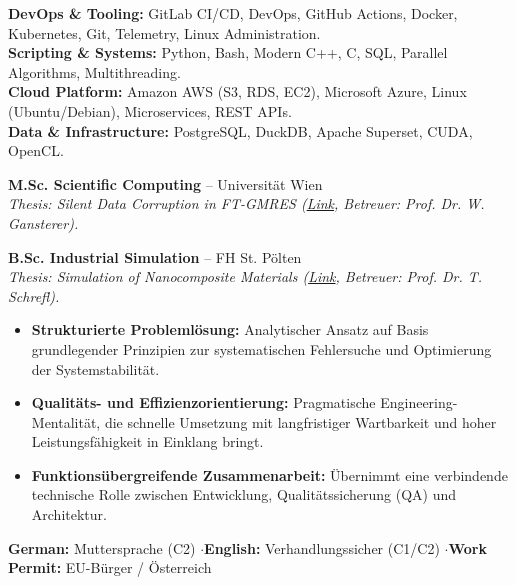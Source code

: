 \documentclass[10pt,a4paper]{article}
\begin{document}

\textbf{DevOps \& Tooling:} GitLab CI/CD, DevOps, GitHub Actions, Docker, Kubernetes, Git, Telemetry, Linux Administration.\\[0.05em]
\textbf{Scripting \& Systems:} Python, Bash, Modern C++, C, SQL, Parallel Algorithms, Multithreading.\\[0.05em]
\textbf{Cloud Platform:} Amazon AWS (S3, RDS, EC2), Microsoft Azure, Linux (Ubuntu/Debian), Microservices, REST APIs.\\[0.05em]
\textbf{Data \& Infrastructure:} PostgreSQL, DuckDB, Apache Superset, CUDA, OpenCL.


\textbf{M.Sc. Scientific Computing} -- Universität Wien \\
\textit{Thesis: Silent Data Corruption in FT-GMRES (\href{https://utheses.univie.ac.at/detail/40917/}{Link}, Betreuer: Prof. Dr. W. Gansterer).}

\vspace{0.1cm}
\textbf{B.Sc. Industrial Simulation} -- FH St. Pölten \\
\textit{Thesis: Simulation of Nanocomposite Materials (\href{\meinGithub/thesis/blob/master/Bakkarbeit_final.pdf}{Link}, Betreuer: Prof. Dr. T. Schrefl).}

\newcommand{\engineeringApproachde}{%
\cvsection{Technischer Ansatz & Arbeitsweise}%
\begin{itemize}[leftmargin=*, itemsep=2pt]%
\item \textbf{Strukturierte Problemlösung:} Analytischer Ansatz auf Basis grundlegender Prinzipien zur systematischen Fehlersuche und Optimierung der Systemstabilität.%
\item \textbf{Qualitäts- und Effizienzorientierung:} Pragmatische Engineering-Mentalität, die schnelle Umsetzung mit langfristiger Wartbarkeit und hoher Leistungsfähigkeit in Einklang bringt.%
\item \textbf{Funktionsübergreifende Zusammenarbeit:} Übernimmt eine verbindende technische Rolle zwischen Entwicklung, Qualitätssicherung (QA) und Architektur.%
\end{itemize}%
}

\engineeringApproachde



\textbf{German:} Muttersprache (C2) \quad$\cdot$\quad \textbf{English:} Verhandlungssicher (C1/C2) \quad$\cdot$\quad \textbf{Work Permit:} EU-Bürger / Österreich
\end{document}
